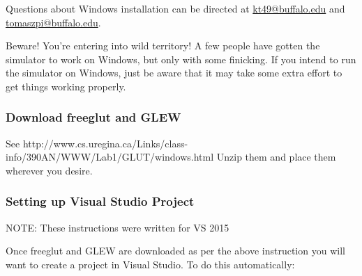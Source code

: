 \documentclass[12pt]{article}
\begin{document}
Questions about Windows installation can be directed at \url{kt49@buffalo.edu}
and \url{tomaszpi@buffalo.edu}.

Beware! You're entering into wild territory! A few people have gotten the
simulator to work on Windows, but only with some finicking. If you intend to
run the simulator on Windows, just be aware that it may take some extra effort
to get things working properly.

\subsubsection{Download freeglut and GLEW}

See http://www.cs.uregina.ca/Links/class-info/390AN/WWW/Lab1/GLUT/windows.html
Unzip them and place them wherever you desire.

\subsubsection{Setting up Visual Studio Project}

NOTE: These instructions were written for VS 2015

Once freeglut and GLEW are downloaded as per the above instruction you will
want to create a project in Visual Studio.  To do this automatically:
\end{document}
